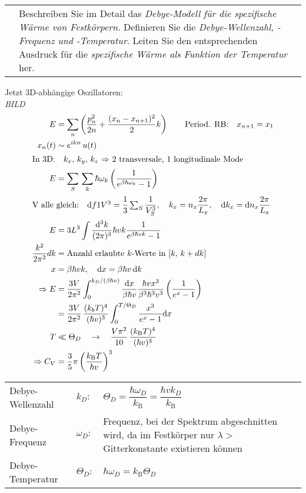 \documentclass[a4paper,12pt]{scrartcl}
\makeatletter
\def\df#1#2{\dfrac{#1}{#2}}				%
\def\ka#1{\left(#1\right)}				%
\def\d{\mathrm{d}}					%
\def\ddd{\mathrm{d}^3}					%
\def\kB{k_\mathrm{B}}					%
\newcounter{qc}\setcounter{qc}{1}
\newenvironment{fshaded}{
\def\FrameCommand{\fcolorbox{framecolor}{shadecolor}}
\MakeFramed {\FrameRestore}}
{\endMakeFramed}
\def\frage#1{
\begin{fshaded}
\noindent
\begin{tabularx}{0.99\textwidth}{@{}c!{\color{framecolor}\vline}X}
{ \bf \rm \theqc }	&	\noindent #1
\end{tabularx}
\stepcounter{qc}
\end{fshaded}
}
\makeatother
\begin{document}

\frage{Beschreiben Sie im Detail das \textit{Debye-Modell für die spezifische Wärme von Festkörpern}. Definieren Sie die 
\textit{Debye-Wellenzahl, -Frequenz und -Temperatur}. Leiten Sie den entsprechenden Ausdruck für die \textit{spezifische Wärme als Funktion der Temperatur} her.}
\noindent
Jetzt 3D-abhängige Oszillatoren:\\
\textit{BILD}\\
\begin{align*}
E&=\sum_n \ka{\df{p_n^2}{2n}+\df{(x_n-x_{n+1})^2}{2}k} \qquad \text{Period. RB:}\quad x_{n+1}=x_1\\
x_n(t)&\sim e^{ikn}\,u(t)\\
\intertext{In 3D:$\quad k_x,\,k_y,\,k_z$ $\Rightarrow$ 2 transversale, 1 longitudinale Mode}
E&=\sum_S\,\sum_k \hbar \omega_k \ka{\df{1}{e^{\beta \hbar \omega_k}-1}}\\
\intertext{V alle gleich:$\quad\d f{1}{V^3}=\df{1}{3}\sum_S \df{1}{V_S^3},\quad k_x=n_x \df{2 \pi}{L_x},\quad \d k_x=\d n_x \df{2 
\pi}{L_x}$}
E&=3L^3\int \df{\ddd k}{(2\pi)^3} \hbar vk \df{1}{e^{\beta \hbar vk}-1}\\
\df{k^2}{2\pi^2}dk &= \text{Anzahl erlaubte $k$-Werte in $[k,\,k+dk]$}\\
x&=\beta \hbar vk,\quad \d x=\beta \hbar v \,\d k\\
\Rightarrow E&=\df{3V}{2\pi^2} \int_0^{k_D/(\beta \hbar v)} \df{\d x}{\beta \hbar v} \df{\hbar v x^3}{\beta^3\hbar^3v^3} 
\ka{\df{1}{e^x-1}}\\
&=\df{3V}{2\pi^2}\,\df{(k_bT)^4}{(\hbar v)^3}\int_0^{T/\Theta_D} \df{x^3}{e^x-1}\d x\\
T &\ll \Theta_D \quad \rightarrow \quad \df{V \pi^2}{10}\,\df{(\kB  T)^4}{(\hbar v)^3}\\
\Rightarrow C_V &= \df{3}{5} \pi \ka{\df{\kB  T}{\hbar v}}^3
\end{align*}
\begin{tabularx}{\textwidth}{@{}llX}
Debye-Wellenzahl& $k_D:$ & $\Theta_D=\df{\hbar \omega_D}{\kB }=\df{\hbar v k_D}{\kB }$\\
Debye-Frequenz& $\omega_D:$ & Frequenz, bei der Spektrum abgeschnitten wird, da im Festkörper nur $\lambda>$Gitterkonstante 
existieren können\\
Debye-Temperatur& $\Theta_D:$ & $\hbar\omega_D=\kB  \Theta_D$
\end{tabularx}\\
\end{document}
